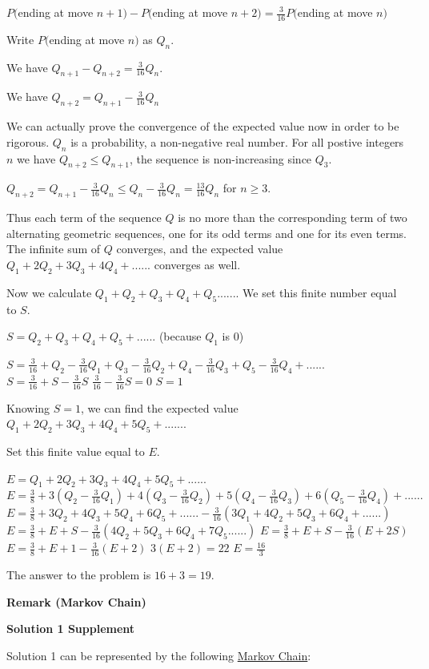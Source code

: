 \begin{enumerate}
 $P($ending at move ${n+1})-$$P($ending at move ${n+2})$$=\frac{3}{16}P($ending at move $n)$

 
Write $P($ending at move $n)$ as $Q_n$.

 We have $Q_{n+1}-Q_{n+2}=\frac{3}{16}Q_n$.

 We have $Q_{n+2}=Q_{n+1}-\frac{3}{16}Q_n$

 
We can actually prove the convergence of the expected value now in order to be rigorous. $Q_n$ is a probability, a non-negative real number. For all postive integers $n$ we have $Q_{n+2}\leq Q_{n+1}$, the sequence is non-increasing since $Q_3$.

 $Q_{n+2}=Q_{n+1}-\frac{3}{16}Q_n\leq Q_n-\frac{3}{16}Q_n=\frac{13}{16}Q_n$ for $n\geq3$.

 Thus each term of the sequence $Q$ is no more than the corresponding term of two alternating geometric sequences, one for its odd terms and one for its even terms. The infinite sum of $Q$ converges, and the expected value $Q_1+2Q_2+3Q_3+4Q_4+......$ converges as well.

 
Now we calculate $Q_1+Q_2+Q_3+Q_4+Q_5......$. We set this finite number equal to $S$.

 $S=Q_2+Q_3+Q_4+Q_5+......$ (because $Q_1$ is $0$)

 $S=\frac{3}{16}+Q_2-\frac{3}{16}Q_1+Q_3-\frac{3}{16}Q_2+Q_4-\frac{3}{16}Q_3+Q_5-\frac{3}{16}Q_4+......$
$S=\frac{3}{16}+S-\frac{3}{16}S$
$\frac{3}{16}-\frac{3}{16}S=0$
$S=1$

 
Knowing $S=1$, we can find the expected value $Q_1+2Q_2+3Q_3+4Q_4+5Q_5+......$.

 
Set this finite value equal to $E$.

 $E=Q_1+2Q_2+3Q_3+4Q_4+5Q_5+......$
$E=\frac{3}{8}+3(Q_2-\frac{3}{16}Q_1)+4(Q_3-\frac{3}{16}Q_2)+5(Q_4-\frac{3}{16}Q_3)+6(Q_5-\frac{3}{16}Q_4)+......$
$E=\frac{3}{8}+3Q_2+4Q_3+5Q_4+6Q_5+......-\frac{3}{16}(3Q_1+4Q_2+5Q_3+6Q_4+......)$
$E=\frac{3}{8}+E+S-\frac{3}{16}(4Q_2+5Q_3+6Q_4+7Q_5......)$
$E=\frac{3}{8}+E+S-\frac{3}{16}(E+2S)$
$E=\frac{3}{8}+E+1-\frac{3}{16}(E+2)$
$3(E+2)=22$
$E=\frac{16}{3}$

 
The answer to the problem is $16+3=19$.

 \textbf{Remark (Markov Chain)} 



\textbf{Solution 1 Supplement}

Solution 1 can be represented by the following \href{https://en.wikipedia.org/wiki/Markov\_chain}{Markov Chain}:


\end{enumerate}
